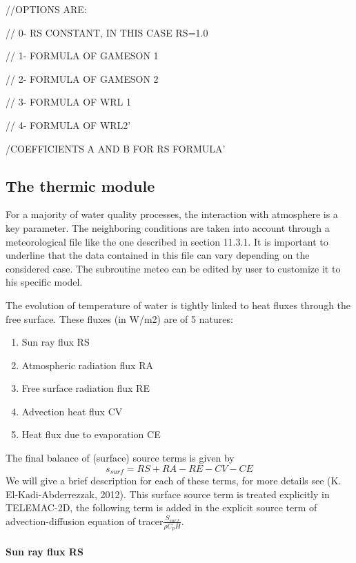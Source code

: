  //OPTIONS ARE:

 //  0- RS CONSTANT, IN THIS CASE RS=1.0

 //  1- FORMULA OF GAMESON 1

 //  2- FORMULA OF GAMESON 2

 //  3- FORMULA OF WRL 1

 //  4- FORMULA OF WRL2'

 /COEFFICIENTS A AND B FOR RS FORMULA'


\subsection{ The thermic module}



 For a majority of water quality processes, the interaction with atmosphere is a key parameter. The neighboring conditions are taken into account through a meteorological file like the one described in section 11.3.1. It is important to underline that the data contained in this file can vary depending on the considered case. The subroutine meteo can be edited by user to customize it to his specific model.

 The evolution of temperature of water is tightly linked to heat fluxes through the free surface. These fluxes (in W/m2) are of 5 natures:

\begin{enumerate}
\item  Sun ray flux RS

\item  Atmospheric radiation flux RA

\item  Free surface radiation flux RE

\item  Advection heat flux CV

\item  Heat flux due to evaporation CE
\end{enumerate}

 The final balance of (surface) source terms is given by
\[s_{surf}=RS+RA-RE-CV-CE\]
We will give a brief description for each of these terms, for more details see (K. El-Kadi-Abderrezzak, 2012). This surface source term is treated explicitly in TELEMAC-2D, the following term is added in the explicit source term of advection-diffusion equation of tracer$\frac{S_{surf}}{\rho C_pH}$.


\paragraph{ Sun ray flux RS}

